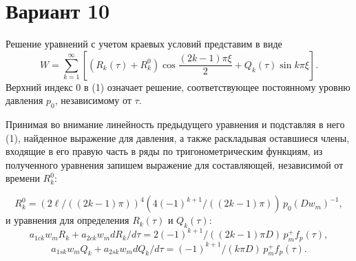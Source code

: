 \documentclass{article}
\begin{document}
\section*{Вариант 10}
Решение уравнений с учетом краевых условий представим в виде
\begin{equation}
W = \sum_{k=1}^\infty \left[ (R_k(\tau) + R_k^0) \cos \frac{(2k-1)\pi\xi}{2} + Q_k(\tau) \sin k\pi\xi \right].
\end{equation}
Верхний индекс 0 в (1) означает решение, соответствующее постоянному уровню давления \( p_0 \), независимому от \( \tau \).

Принимая во внимание линейность предыдущего уравнения и подставляя в него (1), найденное выражение для давления, а также раскладывая оставшиеся члены, входящие в его правую часть в ряды по тригонометрическим функциям, из полученного уравнения запишем выражение для составляющей, независимой от времени \( R_k^0 \):

\begin{equation*}
R_k^0 = (2\ell/((2k-1)\pi))^4 (4(-1)^{k+1}/((2k-1)\pi)) \, p_0 (Dw_m)^{-1},
\end{equation*}
и уравнения для определения \( R_k(\tau) \) и \( Q_k(\tau) \):
\begin{equation}
a_{1ck} w_m R_k + a_{2ck} w_m dR_k/d\tau
= 2(-1)^{k+1} / ((2k-1)\pi D) \, p_m^+ f_p(\tau),
\end{equation}
\begin{equation}
a_{1sk} w_m Q_k + a_{2sk} w_m dQ_k/d\tau
= (-1)^{k+1} / (k\pi D) \, p_m^+ f_p(\tau).
\end{equation}
\end{document}
